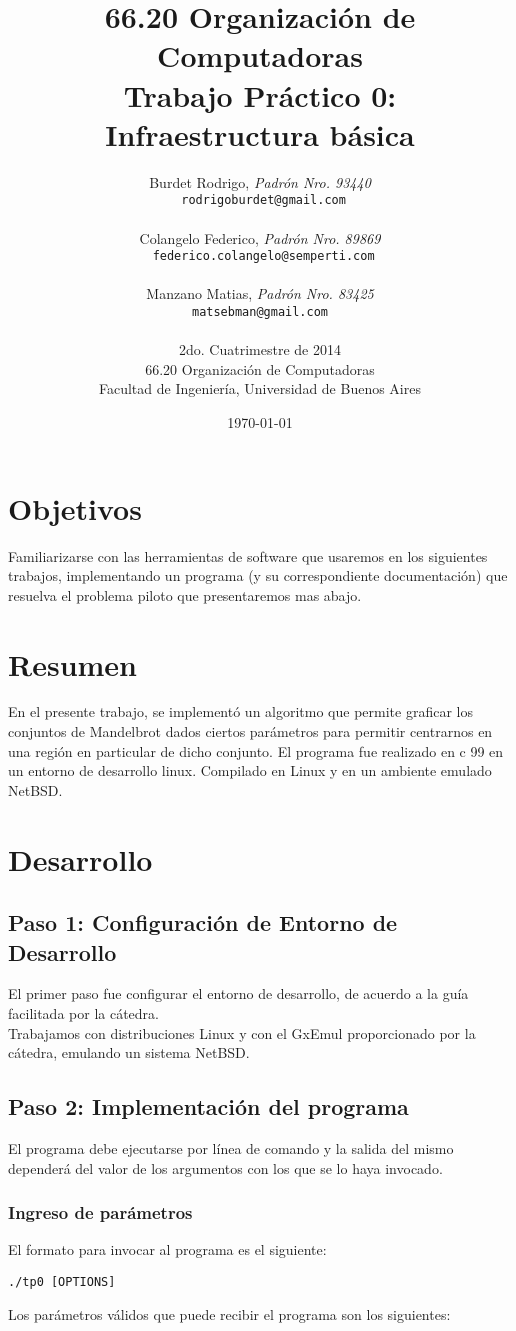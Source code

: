 \documentclass[a4paper,10pt,oneside]{article}
\title{\textbf{66.20 Organización de Computadoras\\ Trabajo Práctico 0: \\ Infraestructura básica}}
\author{	Burdet Rodrigo, \textit{Padrón Nro. 93440}\\
            \texttt{ rodrigoburdet@gmail.com}\\\\
            Colangelo Federico, \textit{Padrón Nro. 89869}                     \\
            \texttt{ federico.colangelo@semperti.com}\\\\
            Manzano Matias, \textit{Padrón Nro. 83425}                     \\
            \texttt{ matsebman@gmail.com }\\\\[2.5ex]
            \normalsize{2do. Cuatrimestre de 2014}                       \\
			\normalsize{66.20 Organización de Computadoras}\\
            \normalsize{Facultad de Ingeniería, Universidad de Buenos Aires}            \\
       }
\date{\today}
\begin{document}
\maketitle

\thispagestyle{empty}

\newpage

\section{Objetivos}
    Familiarizarse con las herramientas de software que usaremos en los siguientes trabajos, implementando un programa (y su correspondiente documentación) que resuelva el problema piloto que presentaremos mas abajo.

\section{Resumen}
	En el presente trabajo, se implementó un algoritmo que permite graficar los conjuntos de Mandelbrot dados ciertos parámetros para permitir centrarnos en una región en particular de dicho conjunto.
	El programa fue realizado en c 99 en un entorno de desarrollo linux. Compilado en Linux y en un ambiente emulado NetBSD.

\section{Desarrollo}
	
\subsection{Paso 1: Configuración de Entorno de Desarrollo}
El primer paso fue configurar el entorno de desarrollo, de acuerdo a la guía facilitada por la cátedra. \\
Trabajamos con distribuciones Linux y con el GxEmul proporcionado por la cátedra, emulando un sistema NetBSD.	
\subsection{Paso 2: Implementación del programa}
El programa debe ejecutarse por línea de comando y la salida del mismo dependerá del valor de los argumentos con los que se lo haya invocado.
\subsubsection{Ingreso de parámetros}
El formato para invocar al programa es el siguiente:
\begin{center}
	\texttt{./tp0 [OPTIONS]}
\end{center}
Los parámetros válidos que puede recibir el programa son los siguientes: \\ 
\end{document}
